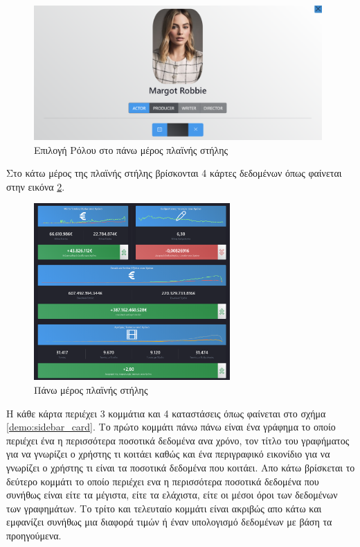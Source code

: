 \begin{figure}[h]
  \centering
  \includegraphics[width=110mm]{Chapters/6 - Manual/Images/main_page_sidebar_top_person.png}
  \caption{Επιλογή Ρόλου στο πάνω μέρος πλαϊνής στήλης}
  \label{demo:sidebar_top_person}
\end{figure}

Στο κάτω μέρος της πλαϊνής στήλης βρίσκονται 4 κάρτες δεδομένων όπως φαίνεται στην εικόνα \ref{demo:sidebar_bottom}.

\begin{figure}[h]
  \centering
  \includegraphics[width=75mm]{Chapters/6 - Manual/Images/main_page_sidebar_bottom.png}
  \caption{Πάνω μέρος πλαϊνής στήλης}
  \label{demo:sidebar_bottom}
\end{figure}

Η κάθε κάρτα περιέχει 3 κομμάτια και 4 καταστάσεις όπως φαίνεται στο σχήμα \ref{demo:sidebar_card}. Το πρώτο κομμάτι πάνω πάνω είναι ένα γράφημα το οποίο περιέχει ένα η περισσότερα ποσοτικά δεδομένα ανα χρόνο, τον τίτλο του γραφήματος για να γνωρίζει ο χρήστης τι κοιτάει καθώς και ένα περιγραφικό εικονίδιο για να γνωρίζει ο χρήστης τι είναι τα ποσοτικά δεδομένα που κοιτάει. Απο κάτω βρίσκεται το δεύτερο κομμάτι το οποίο περιέχει ενα η περισσότερα ποσοτικά δεδομένα που συνήθως είναι είτε τα μέγιστα, είτε τα ελάχιστα, είτε οι μέσοι όροι των δεδομένων των γραφημάτων. Το τρίτο και τελευταίο κομμάτι είναι ακριβώς απο κάτω και εμφανίζει συνήθως μια διαφορά τιμών ή έναν υπολογισμό δεδομένων με βάση τα προηγούμενα. 

